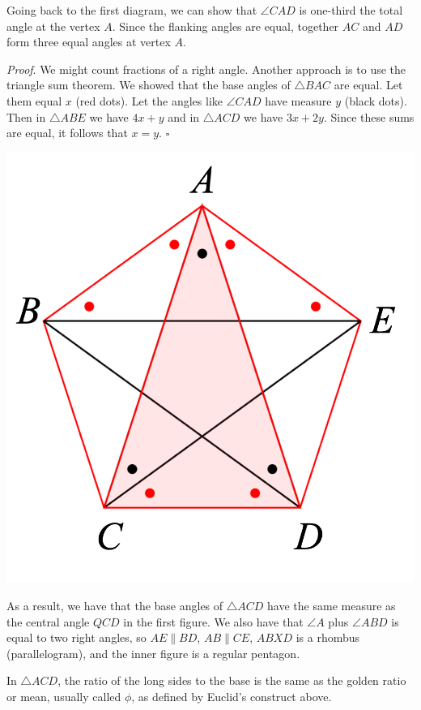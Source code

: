 \documentclass[11pt, oneside]{article}
\begin{document}
Going back to the first diagram, we can show that $\angle CAD$ is one-third the total angle at the vertex $A$.  Since the flanking angles are equal, together $AC$ and $AD$ form three equal angles at vertex $A$.

\emph{Proof}.  We might count fractions of a right angle.  Another approach is to use the triangle sum theorem.  We showed that the base angles of $\triangle BAC$ are equal.  Let them equal $x$ (red dots).  Let the angles like $\angle CAD$ have measure $y$ (black dots).  Then in $\triangle ABE$ we have $4x + y$ and in $\triangle ACD$ we have $3x + 2y$.  Since these sums are equal, it follows that $x = y$.  $\square$

\begin{center} \includegraphics [scale=0.4] {pent2_label.png} \end{center}

As a result, we have that the base angles of $\triangle ACD$ have the same measure as the central angle $QCD$ in the first figure.  We also have that $\angle A$ plus $\angle ABD$ is equal to two right angles, so $AE \parallel BD$, $AB \parallel CE$, $ABXD$ is a rhombus (parallelogram), and the inner figure is a regular pentagon.

In $\triangle ACD$, the ratio of the long sides to the base is the same as the golden ratio or mean, usually called $\phi$, as defined by Euclid's construct above.
\end{document}
